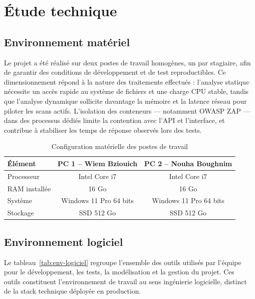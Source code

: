 \section{Étude technique}

\subsection{Environnement matériel}

Le projet a été réalisé sur deux postes de travail homogènes, un par stagiaire, afin
de garantir des conditions de développement et de test reproductibles. Ce dimensionnement
répond à la nature des traitements effectués : l'analyse statique nécessite un accès
rapide au système de fichiers et une charge CPU stable, tandis que l'analyse dynamique
sollicite davantage la mémoire et la latence réseau pour piloter les scans actifs.
L'isolation des conteneurs — notamment OWASP ZAP — dans des processus dédiés limite
la contention avec l'API et l'interface, et contribue à stabiliser les temps de réponse
observés lors des tests.

\begin{table}[H]
\centering
\caption{Configuration matérielle des postes de travail}
\label{tab:env-materiel}
\renewcommand{\arraystretch}{1.2}
\begin{tabular}{|l|c|c|}
\hline
\rowcolor{gray!15}
\textbf{Élément} & \textbf{PC 1 -- Wiem Bziouich} & \textbf{PC 2 -- Nouha Boughnim} \\
\hline
Processeur     & Intel Core i7 & Intel Core i7 \\
RAM installée  & 16 Go         & 16 Go         \\
Système        & Windows 11 Pro 64 bits & Windows 11 Pro 64 bits \\
Stockage       & SSD 512 Go    & SSD 512 Go    \\
\hline
\end{tabular}
\end{table}

\subsection{Environnement logiciel}

Le tableau~\ref{tab:env-logiciel} regroupe l'ensemble des outils utilisés par l'équipe
pour le développement, les tests, la modélisation et la gestion du projet. Ces outils
constituent l'environnement de travail au sens ingénierie logicielle, distinct de la
stack technique déployée en production.

